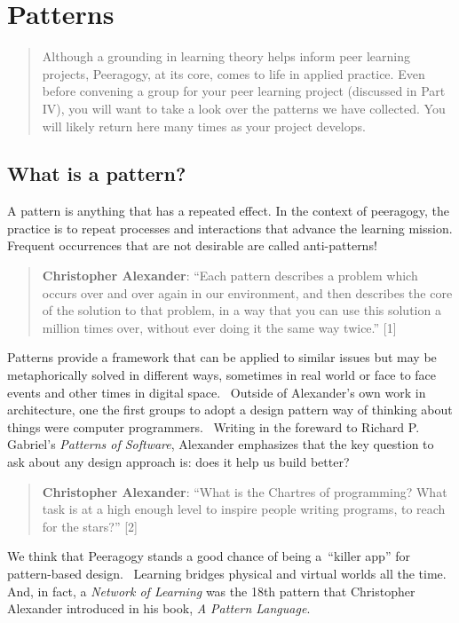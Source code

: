 \section{Patterns}

\begin{quote}
Although a grounding in learning theory helps inform peer learning
projects, Peeragogy, at its core, comes to life in applied practice.
Even before convening a group for your peer learning project
(discussed in Part IV), you will want to take a look
over the patterns we have collected.  You will likely return here many
times as your project develops.
\end{quote}

\subsection{What is a pattern?}

A pattern is anything that has a repeated effect. In the context of
peeragogy, the practice is to repeat processes and interactions that
advance the learning mission. Frequent occurrences that are not
desirable are called anti-patterns!

\begin{quote}
\textbf{Christopher Alexander}: ``Each pattern describes a problem which
occurs over and over again in our environment, and then describes the
core of the solution to that problem, in a way that you can use this
solution a million times over, without ever doing it the same way
twice.'' {[}1{]}
\end{quote}

Patterns provide a framework that can be applied to similar issues but
may be metaphorically solved in different ways, sometimes in real world
or face to face events and other times in digital space.~ Outside of
Alexander's own work in architecture, one the first groups to adopt a
design pattern way of thinking about things were computer programmers.~
Writing in the foreward to Richard P. Gabriel's \emph{Patterns of
Software}, Alexander emphasizes that the key question to ask about any
design approach is: does it help us build better?

\begin{quote}
\textbf{Christopher Alexander}: ``What is the Chartres of programming?
What task is at a high enough level to inspire people writing programs,
to reach for the stars?'' {[}2{]}
\end{quote}

We think that Peeragogy stands a good chance of being a~``killer app''
for pattern-based design.~ Learning bridges physical and virtual worlds
all the time.~ And, in fact, a \emph{Network of Learning} was the 18th
pattern that Christopher Alexander introduced in his book, \emph{A
Pattern Language}.

